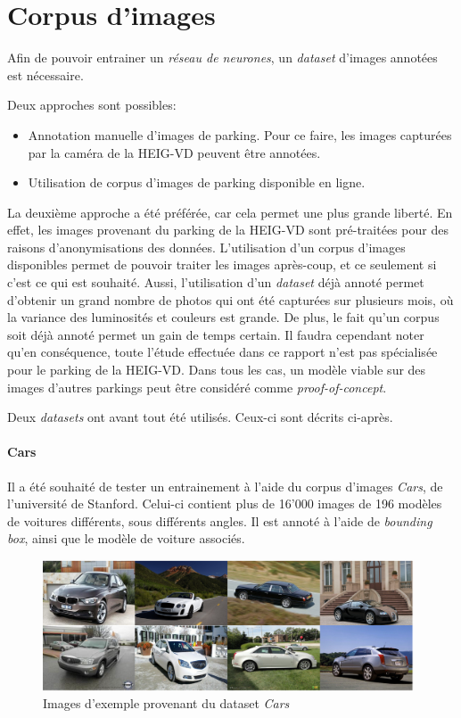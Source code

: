 \section{Corpus d'images}\label{conception.dataset}

Afin de pouvoir entrainer un \textit{réseau de neurones}, un \textit{dataset} d'images annotées est nécessaire.

Deux approches sont possibles:
\begin{itemize}
    \item Annotation manuelle d'images de parking. Pour ce faire, les images capturées par la caméra de la HEIG-VD peuvent être annotées. 
    \item Utilisation de corpus d'images de parking disponible en ligne.
\end{itemize}

La deuxième approche a été préférée, car cela permet une plus grande liberté. En effet, les images provenant du parking de la HEIG-VD sont pré-traitées pour des raisons d'anonymisations des données. L'utilisation d'un corpus d'images disponibles permet de pouvoir traiter les images après-coup, et ce seulement si c'est ce qui est souhaité. Aussi, l'utilisation d'un \textit{dataset} déjà annoté permet d'obtenir un grand nombre de photos qui ont été capturées sur plusieurs mois, où la variance des luminosités et couleurs est grande. De plus, le fait qu'un corpus soit déjà annoté permet un gain de temps certain. Il faudra cependant noter qu'en conséquence, toute l'étude effectuée dans ce rapport n'est pas spécialisée pour le parking de la HEIG-VD. Dans tous les cas, un modèle viable sur des images d'autres parkings peut être considéré comme \textit{proof-of-concept}.

Deux \textit{datasets} ont avant tout été utilisés. Ceux-ci sont décrits ci-après.

\paragraph{Cars}
Il a été souhaité de tester un entrainement à l'aide du corpus d'images \textit{Cars}\autocite{data:cars}, de l'université de Stanford. Celui-ci contient plus de 16'000 images de 196 modèles de voitures différents, sous différents angles. Il est annoté à l'aide de \textit{bounding box}, ainsi que le modèle de voiture associés. 

\begin{figure}[ht]
    \includegraphics[width=110mm]{img/conception/cars_example.png}
    \centering
    \caption{Images d'exemple provenant du dataset \textit{Cars}}
\end{figure}

